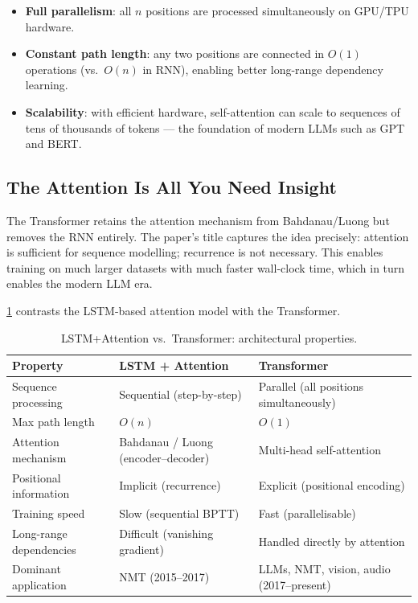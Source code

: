 \documentclass[12pt,a4paper]{article}
\begin{document}
\begin{itemize}
  \item \textbf{Full parallelism}: all $n$ positions are processed
        simultaneously on GPU/TPU hardware.
  \item \textbf{Constant path length}: any two positions are
        connected in $O(1)$ operations (vs.\ $O(n)$ in RNN), enabling
        better long-range dependency learning.
  \item \textbf{Scalability}: with efficient hardware, self-attention
        can scale to sequences of tens of thousands of tokens ---
        the foundation of modern LLMs such as GPT and BERT.
\end{itemize}

\subsection{The Attention Is All You Need Insight}

\begin{keyinsight}[title=Attention Is All You Need (Vaswani et al., 2017)]
  The Transformer retains the attention mechanism from
  Bahdanau/Luong but removes the RNN entirely.  The paper's title
  captures the idea precisely: attention is sufficient for sequence
  modelling; recurrence is not necessary.  This enables training on
  much larger datasets with much faster wall-clock time, which in turn
  enables the modern LLM era.
\end{keyinsight}

\cref{tab:rnntransformer} contrasts the LSTM-based attention model
with the Transformer.

\begin{table}[ht]
\centering
\caption{LSTM+Attention vs.\ Transformer: architectural properties.}
\label{tab:rnntransformer}
\begin{tabular}{@{}p{4cm}p{4.5cm}p{4.5cm}@{}}
\toprule
\textbf{Property}
  & \textbf{LSTM + Attention}
  & \textbf{Transformer} \\
\midrule
Sequence processing
  & Sequential (step-by-step)
  & Parallel (all positions simultaneously) \\[4pt]
Max path length
  & $O(n)$
  & $O(1)$ \\[4pt]
Attention mechanism
  & Bahdanau / Luong (encoder--decoder)
  & Multi-head self-attention \\[4pt]
Positional information
  & Implicit (recurrence)
  & Explicit (positional encoding) \\[4pt]
Training speed
  & Slow (sequential BPTT)
  & Fast (parallelisable) \\[4pt]
Long-range dependencies
  & Difficult (vanishing gradient)
  & Handled directly by attention \\[4pt]
Dominant application
  & NMT (2015--2017)
  & LLMs, NMT, vision, audio (2017--present) \\
\bottomrule
\end{tabular}
\end{table}
\end{document}
